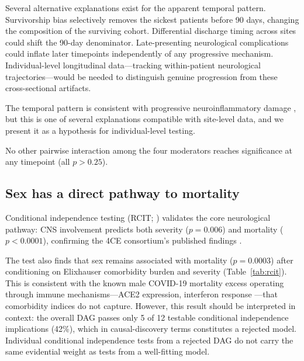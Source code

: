 \documentclass{article}
\begin{document}
Several alternative explanations exist for the apparent temporal pattern.
Survivorship bias selectively removes the sickest patients before 90 days, changing the composition of the surviving cohort.
Differential discharge timing across sites could shift the 90-day denominator.
Late-presenting neurological complications could inflate later timepoints independently of any progressive mechanism.
Individual-level longitudinal data---tracking within-patient neurological trajectories---would be needed to distinguish genuine progression from these cross-sectional artifacts.

The temporal pattern is consistent with progressive neuroinflammatory damage \cite{douaud2022brain, nalbandian2021pasc}, but this is one of several explanations compatible with site-level data, and we present it as a hypothesis for individual-level testing.

No other pairwise interaction among the four moderators reaches significance at any timepoint (all $p > 0.25$).


\subsection{Sex has a direct pathway to mortality}

Conditional independence testing (RCIT; \citealt{strobl2019rcit}) validates the core neurological pathway: CNS involvement predicts both severity ($p = 0.006$) and mortality ($p < 0.0001$), confirming the 4CE consortium's published findings \cite{four_ce_neuro2021}.

The test also finds that sex remains associated with mortality ($p = 0.0003$) after conditioning on Elixhauser comorbidity burden \cite{elixhauser1998} and severity (Table~\ref{tab:rcit}).
This is consistent with the known male COVID-19 mortality excess operating through immune mechanisms---ACE2 expression, interferon response \cite{takahashi2020sex, iadecola2020covid}---that comorbidity indices do not capture.
However, this result should be interpreted in context: the overall DAG passes only 5 of 12 testable conditional independence implications (42\%), which in causal-discovery terms constitutes a rejected model.
Individual conditional independence tests from a rejected DAG do not carry the same evidential weight as tests from a well-fitting model.
\end{document}
